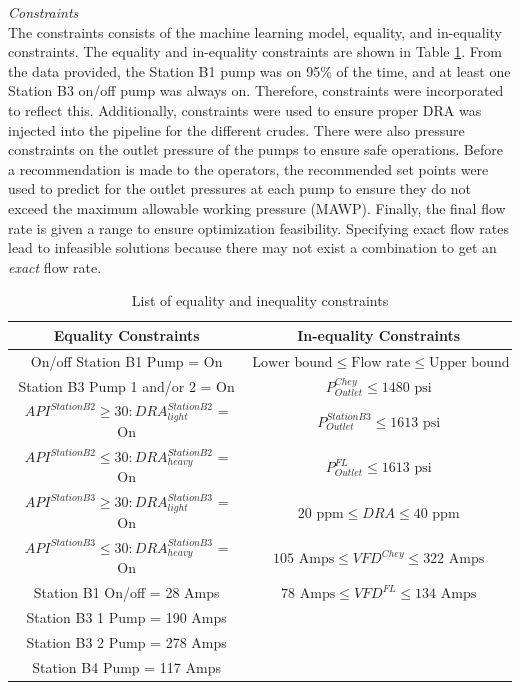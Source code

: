 \noindent
\textit{Constraints} \\
The constraints consists of the machine learning model, equality, and in-equality constraints.  The equality and in-equality constraints are shown in Table \ref{tab:08eq_neq_constraints}. From the data provided, the Station B1 pump was on 95\% of the time, and at least one Station B3 on/off pump was always on. Therefore, constraints were incorporated to reflect this.  Additionally, constraints were used to ensure proper DRA was injected into the pipeline for the different crudes.  There were also pressure constraints on the outlet pressure of the pumps to ensure safe operations.  Before a recommendation is made to the operators, the recommended set points were used to predict for the outlet pressures at each pump to ensure they do not exceed the maximum allowable working pressure (MAWP). Finally, the final flow rate is given a range to ensure optimization feasibility. Specifying exact flow rates lead to infeasible solutions because there may not exist a combination to get an \textit{exact} flow rate.

\begin{table}[h]
    \centering
    {
    \begin{tabular}{c|c}
         Equality Constraints              & In-equality Constraints \\
         \hline
         On/off Station B1 Pump = On         & $\text{Lower bound} \leq \text{Flow rate} \leq \text{Upper bound}$ \\
         
         Station B3 Pump 1 and/or 2 = On          & $P_{Outlet}^{Chey} \leq 1480 \text{ psi}$       \\
         
         $API^{Station B2} \geq 30: DRA_{light}^{Station B2}$ = On & $P_{Outlet}^{Station B3} \leq 1613 \text{ psi}$ \\
         
         $API^{Station B2} \leq 30: DRA_{heavy}^{Station B2}$ = On  & $P_{Outlet}^{FL} \leq 1613 \text{ psi}$  \\
         
         $API^{Station B3} \geq 30: DRA_{light}^{Station B3}$ = On & $20 \text{ ppm} \leq DRA \leq 40 \text{ ppm}$                 \\
         
         $API^{Station B3} \leq 30: DRA_{heavy}^{Station B3}$  = On  & $105 \text{ Amps} \leq VFD^{Chey} \leq 322 \text{ Amps}$   \\
         
         Station B1 On/off = 28 Amps  & $78 \text{ Amps} \leq VFD^{FL} \leq 134 \text{ Amps}$  \\
         Station B3 1 Pump = 190 Amps & \\
         Station B3 2 Pump = 278 Amps & \\
         Station B4 Pump = 117 Amps & \\
    \end{tabular}}   
    \caption{List of equality and inequality constraints}
    \label{tab:08eq_neq_constraints}
\end{table}


